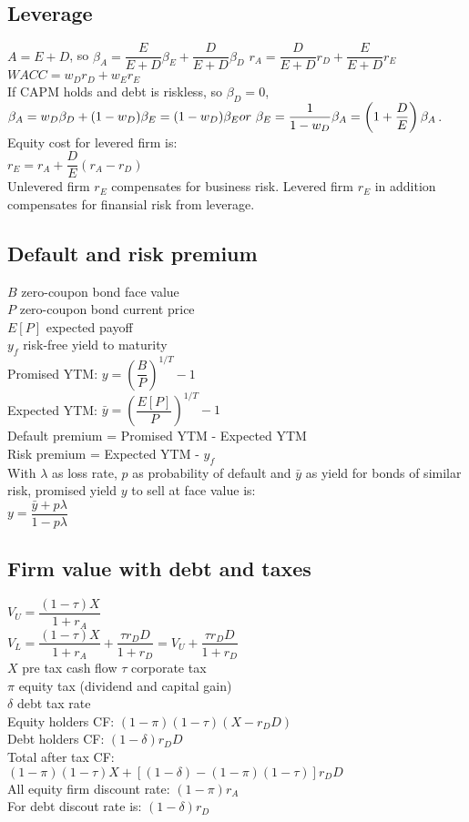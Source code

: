 \subsection*{Leverage}
$A = E + D$, so $\beta_A = \dfrac{E}{E+D}\beta_E + \dfrac{D}{E +D}\beta_D$
$r_A = \dfrac{D}{E +D}r_D + \dfrac{E}{E+D}r_E$ \\ $WACC = w_Dr_D + w_Er_E$\\
If CAPM holds and debt is riskless, so $\beta_D = 0$,\\
$\beta_A = w_D\beta_D + (1-w_D)\beta_E = (1-w_D)\beta_E\\ or\ \beta_E = \dfrac{1}{1-w_D}\beta_A = \left(1+\dfrac{D}{E}\right)\beta_A$.\\
Equity cost for levered firm is:\\ $r_E = r_A + \dfrac{D}{E}(r_A - r_D)$\\
Unlevered firm $r_E$ compensates for business risk. Levered firm $r_E$ in addition compensates for finansial risk from leverage.
\subsection*{Default and risk premium}
$B$ zero-coupon bond face value\\
$P$ zero-coupon bond current price\\
$E[P]$ expected payoff\\
$y_f$ risk-free yield to maturity\\
Promised YTM: $y = \left(\dfrac{B}{P}\right)^{1/T} - 1$\\
Expected YTM: $\bar{y} = \left(\dfrac{E[P]}{P}\right)^{1/T} - 1$\\
Default premium = Promised YTM - Expected YTM\\
Risk premium = Expected YTM - $y_f$\\
With $\lambda$ as loss rate, $p$ as probability of default and $\bar{y}$ as yield for bonds of similar risk, promised yield $y$ to sell at face value is:\\
$y=\dfrac{\bar{y} + p\lambda}{1-p\lambda}$
\subsection*{Firm value with debt and taxes}
$V_U = \dfrac{(1-\tau)X}{1+r_A}$\\
$V_L = \dfrac{(1-\tau)X}{1+r_A} + \dfrac{\tau r_D D}{1+r_D} = V_U + \dfrac{\tau r_D D}{1+r_D}$\\
$X$ pre tax cash flow
$\tau$ corporate tax\\
$\pi$ equity tax (dividend and capital gain)\\
$\delta$ debt tax rate\\
Equity holders CF: $(1-\pi)(1-\tau)(X-r_DD)$\\
Debt holders CF: $(1-\delta)r_DD$\\
Total after tax CF:\\ $(1-\pi)(1-\tau)X + [(1-\delta) - (1-\pi)(1-\tau)]r_DD$\\
All equity firm discount rate: $(1-\pi)r_A$\\
For debt discout rate is: $(1-\delta)r_D$\\
